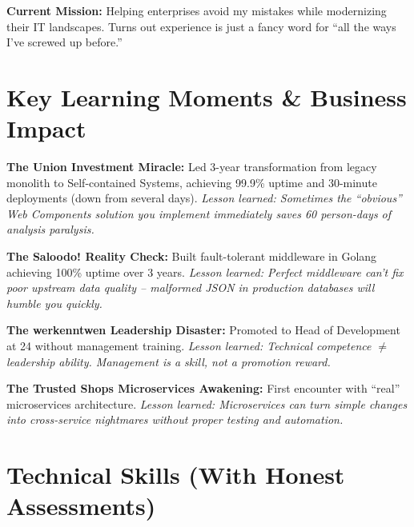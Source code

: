 \documentclass[11pt,a4paper]{article}
\begin{document}
\textbf{Current Mission:} Helping enterprises avoid my mistakes while modernizing their IT landscapes. Turns out experience is just a fancy word for ``all the ways I've screwed up before.''

\vspace{6pt}

\section{Key Learning Moments \& Business Impact}

\textbf{The Union Investment Miracle:} Led 3-year transformation from legacy monolith to Self-contained Systems, achieving 99.9\% uptime and 30-minute deployments (down from several days). \textit{Lesson learned: Sometimes the ``obvious'' Web Components solution you implement immediately saves 60 person-days of analysis paralysis.}

\textbf{The Saloodo! Reality Check:} Built fault-tolerant middleware in Golang achieving 100\% uptime over 3 years. \textit{Lesson learned: Perfect middleware can't fix poor upstream data quality -- malformed JSON in production databases will humble you quickly.}

\textbf{The werkenntwen Leadership Disaster:} Promoted to Head of Development at 24 without management training. \textit{Lesson learned: Technical competence $\neq$ leadership ability. Management is a skill, not a promotion reward.}

\textbf{The Trusted Shops Microservices Awakening:} First encounter with ``real'' microservices architecture. \textit{Lesson learned: Microservices can turn simple changes into cross-service nightmares without proper testing and automation.}

\vspace{6pt}

\section{Technical Skills (With Honest Assessments)}
\end{document}
